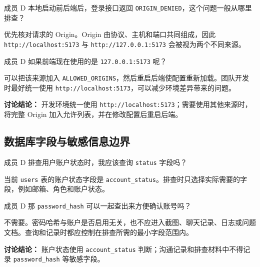 \documentclass[12pt,a4paper]{ctexart}
\begin{document}
\begin{membermsg}{成员 D}
本地启动前后端后，登录接口返回 \texttt{ORIGIN\_DENIED}，这个问题一般从哪里排查？
\end{membermsg}

\begin{gptmsg}
优先核对请求的 Origin。Origin 由协议、主机和端口共同组成，因此 \texttt{http://localhost:5173} 与 \texttt{http://127.0.0.1:5173} 会被视为两个不同来源。
\end{gptmsg}

\begin{membermsg}{成员 D}
如果前端现在使用的是 \texttt{127.0.0.1:5173} 呢？
\end{membermsg}

\begin{gptmsg}
可以把该来源加入 \texttt{ALLOWED\_ORIGINS}，然后重启后端使配置重新加载。团队开发时最好统一使用 \texttt{http://localhost:5173}，可以减少环境差异带来的问题。
\end{gptmsg}

\begin{decisionbox}
\textbf{讨论结论：}
开发环境统一使用 \texttt{http://localhost:5173}；需要使用其他来源时，将完整 Origin 加入允许列表，并在修改配置后重启后端。
\end{decisionbox}


\subsection{数据库字段与敏感信息边界}

\begin{membermsg}{成员 D}
排查用户账户状态时，我应该查询 \texttt{status} 字段吗？
\end{membermsg}

\begin{gptmsg}
当前 \texttt{users} 表的账户状态字段是 \texttt{account\_status}。排查时只选择实际需要的字段，例如邮箱、角色和账户状态。
\end{gptmsg}

\begin{membermsg}{成员 D}
那 \texttt{password\_hash} 可以一起查出来方便确认账号吗？
\end{membermsg}

\begin{gptmsg}
不需要。密码哈希与账户是否启用无关，也不应进入截图、聊天记录、日志或问题文档。查询和记录时都应控制在排查所需的最小字段范围内。
\end{gptmsg}

\begin{decisionbox}
\textbf{讨论结论：}
账户状态使用 \texttt{account\_status} 判断；沟通记录和排查材料中不得记录 \texttt{password\_hash} 等敏感字段。
\end{decisionbox}
\end{document}
